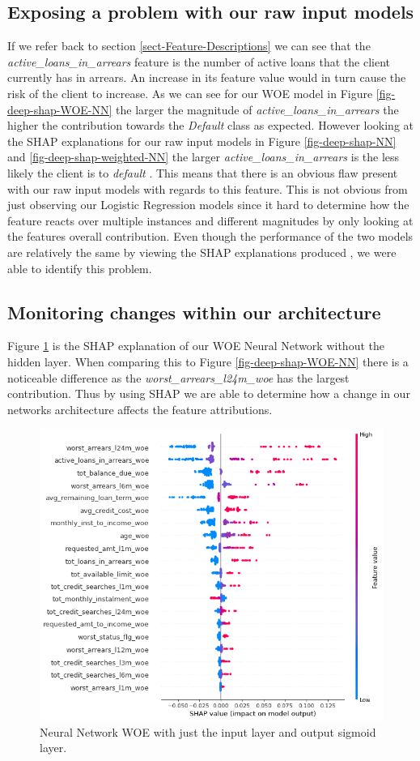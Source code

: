 \subsection{Exposing a problem with our raw input models} \label{sect-problem-expose}
If we refer back to section \ref{sect-Feature-Descriptions} we can see that  the \emph{active\_loans\_in\_arrears} feature is the number of active loans that the client currently has in arrears. An increase in its feature value would in turn cause the risk of the client to increase. As we can see for our WOE model in Figure \ref{fig-deep-shap-WOE-NN} the larger the magnitude of \emph{active\_loans\_in\_arrears} the higher the contribution towards the \emph{Default} class as expected. However looking at the SHAP explanations for our raw input models in Figure \ref{fig-deep-shap-NN} and \ref{fig-deep-shap-weighted-NN} the larger  \emph{active\_loans\_in\_arrears} is the less likely the client is to \emph{default} . This means that there is an obvious flaw present with our raw input models with regards to this feature. This is not obvious from just observing our Logistic Regression models since it hard to determine how the feature reacts over multiple instances and different magnitudes by only looking at the features overall contribution. Even though the performance of the two models are relatively the same by viewing the SHAP explanations produced , we were able to identify this problem.

\subsection{Monitoring changes within our architecture} \label{sect-architecure}
Figure \ref{fig-deep-shap-WOE-sig} is the SHAP explanation of our WOE Neural Network without the hidden layer. When comparing this to Figure \ref{fig-deep-shap-WOE-NN} there is a noticeable difference as the \emph{worst\_arrears\_l24m\_woe} has the largest contribution. Thus by using SHAP we are able to determine how a change in our networks architecture affects the feature attributions.
\begin{figure}[!htpb]
\centering
  \includegraphics[width=0.8\linewidth]{Credit_Images/Sigmoid_nn_shap.png}
   \caption{Neural Network WOE with just the input layer and output sigmoid layer.}
    \label{fig-deep-shap-WOE-sig}
\end{figure}

